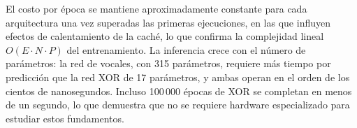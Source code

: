 El costo por época se mantiene aproximadamente constante para cada arquitectura una vez superadas las primeras ejecuciones, en las que influyen efectos de calentamiento de la caché, lo que confirma la complejidad lineal $O(E\cdot N\cdot P)$ del entrenamiento. La inferencia crece con el número de parámetros: la red de vocales, con 315 parámetros, requiere más tiempo por predicción que la red XOR de 17 parámetros, y ambas operan en el orden de los cientos de nanosegundos. Incluso 100\,000 épocas de XOR se completan en menos de un segundo, lo que demuestra que no se requiere hardware especializado para estudiar estos fundamentos.
